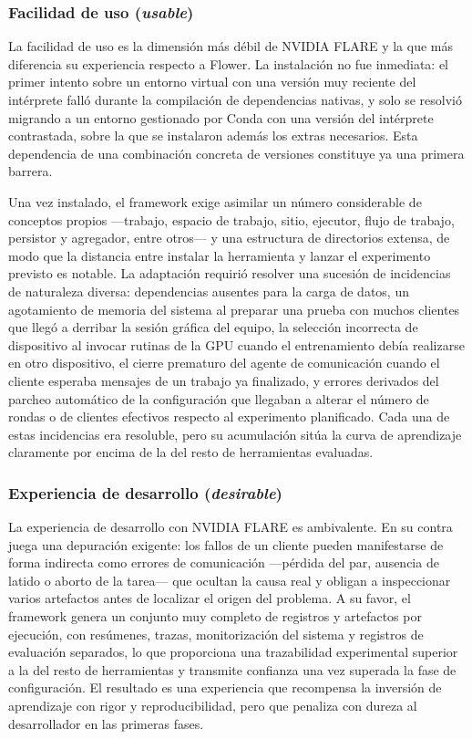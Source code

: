 \subsubsection{Facilidad de uso (\textit{usable})}\label{sec:usab-flare-usable}

La facilidad de uso es la dimensión más débil de NVIDIA FLARE y la que más diferencia su
experiencia respecto a Flower. La instalación no fue inmediata: el primer intento sobre un
entorno virtual con una versión muy reciente del intérprete falló durante la compilación de
dependencias nativas, y solo se resolvió migrando a un entorno gestionado por Conda con una
versión del intérprete contrastada, sobre la que se instalaron además los extras necesarios.
Esta dependencia de una combinación concreta de versiones constituye ya una primera barrera.

Una vez instalado, el framework exige asimilar un número considerable de conceptos propios
—trabajo, espacio de trabajo, sitio, ejecutor, flujo de trabajo, persistor y agregador,
entre otros— y una estructura de directorios extensa, de modo que la distancia entre instalar
la herramienta y lanzar el experimento previsto es notable. La adaptación requirió resolver
una sucesión de incidencias de naturaleza diversa: dependencias ausentes para la carga de
datos, un agotamiento de memoria del sistema al preparar una prueba con muchos clientes que
llegó a derribar la sesión gráfica del equipo, la selección incorrecta de dispositivo al
invocar rutinas de la GPU cuando el entrenamiento debía realizarse en otro dispositivo, el
cierre prematuro del agente de comunicación cuando el cliente esperaba mensajes de un trabajo
ya finalizado, y errores derivados del parcheo automático de la configuración que llegaban a
alterar el número de rondas o de clientes efectivos respecto al experimento planificado. Cada
una de estas incidencias era resoluble, pero su acumulación sitúa la curva de aprendizaje
claramente por encima de la del resto de herramientas evaluadas.

\subsubsection{Experiencia de desarrollo (\textit{desirable})}\label{sec:usab-flare-desirable}

La experiencia de desarrollo con NVIDIA FLARE es ambivalente. En su contra juega una
depuración exigente: los fallos de un cliente pueden manifestarse de forma indirecta como
errores de comunicación —pérdida del par, ausencia de latido o aborto de la tarea— que
ocultan la causa real y obligan a inspeccionar varios artefactos antes de localizar el
origen del problema. A su favor, el framework genera un conjunto muy completo de registros y
artefactos por ejecución, con resúmenes, trazas, monitorización del sistema y registros de
evaluación separados, lo que proporciona una trazabilidad experimental superior a la del
resto de herramientas y transmite confianza una vez superada la fase de configuración. El
resultado es una experiencia que recompensa la inversión de aprendizaje con rigor y
reproducibilidad, pero que penaliza con dureza al desarrollador en las primeras fases.

